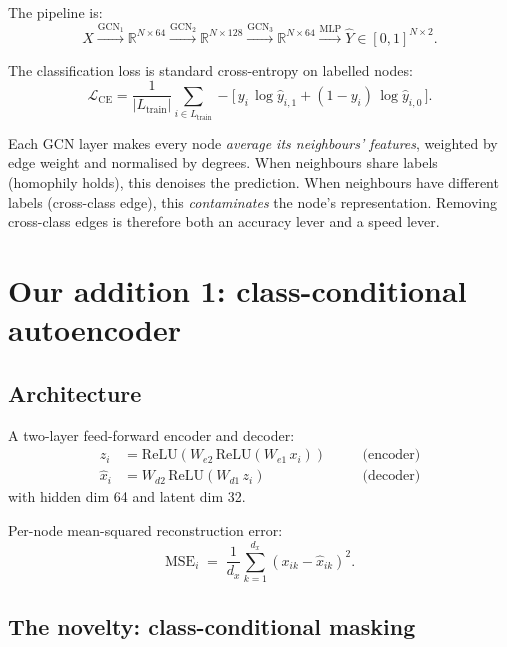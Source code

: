 \documentclass[11pt,a4paper]{article}
\begin{document}
The pipeline is:
\[
X \xrightarrow{\text{GCN}_1} \mathbb{R}^{N\times 64}
  \xrightarrow{\text{GCN}_2} \mathbb{R}^{N\times 128}
  \xrightarrow{\text{GCN}_3} \mathbb{R}^{N\times 64}
  \xrightarrow{\text{MLP}}  \hat{Y} \in [0,1]^{N\times 2}.
\]

The classification loss is standard cross-entropy on labelled nodes:
\begin{equation}
\mathcal{L}_{\text{CE}}
= \frac{1}{|L_{\text{train}}|}
  \sum_{i\in L_{\text{train}}}
  -\!\big[\,y_i\,\log \hat{y}_{i,1} + (1-y_i)\,\log \hat{y}_{i,0}\,\big].
\label{eq:lce}
\end{equation}

\begin{notebox}
Each GCN layer makes every node \emph{average its neighbours' features},
weighted by edge weight and normalised by degrees. When neighbours
share labels (homophily holds), this denoises the prediction. When
neighbours have different labels (cross-class edge), this
\emph{contaminates} the node's representation. Removing cross-class
edges is therefore both an accuracy lever and a speed lever.
\end{notebox}

\section{Our addition 1: class-conditional autoencoder}
\label{sec:ae}

\subsection{Architecture}

A two-layer feed-forward encoder and decoder:
\begin{align}
z_i  &= \mathrm{ReLU}\!\left(W_{e2}\,\mathrm{ReLU}(W_{e1}\,x_i)\right)
        \quad &&\text{(encoder)} \\
\hat{x}_i &= W_{d2}\,\mathrm{ReLU}(W_{d1}\,z_i)
        \quad &&\text{(decoder)}
\end{align}
with hidden dim 64 and latent dim 32.

Per-node mean-squared reconstruction error:
\begin{equation}
\mathrm{MSE}_i \;=\; \frac{1}{d_x}\sum_{k=1}^{d_x}(x_{ik} - \hat{x}_{ik})^2.
\label{eq:mse}
\end{equation}

\subsection{The novelty: class-conditional masking}
\end{document}
